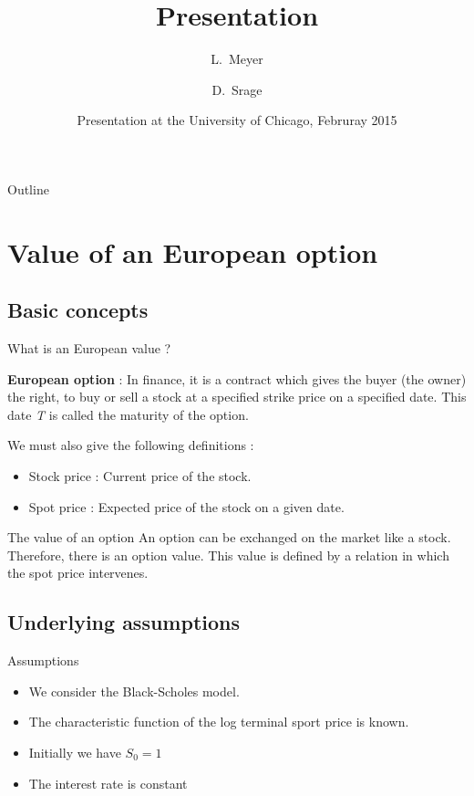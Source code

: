 \documentclass{beamer}
\title{Presentation}
\author{L.~Meyer \and D.~Srage}
\date{Presentation at the University of Chicago, Februray 2015}
\begin{document}
\begin{frame}
  \titlepage
\end{frame}

\begin{frame}{Outline}
  \tableofcontents
\end{frame}

\section{Value of an European option}

\subsection{Basic concepts}

\begin{frame}{What is an European value ?}
\begin{definition}
\textbf{European option} : In finance, it is a contract which gives the buyer (the owner) the right, to buy or sell a stock at a specified \alert{strike price} on a specified date. This date \emph{T} is called the \alert{maturity} of the option. 
\end{definition}
We must also give the following definitions :
\begin{itemize}
\item \alert{Stock price} : Current price of the stock.
\item \alert{Spot price} : Expected price of the stock on a given date.
\end{itemize}
\end{frame}

\begin{frame}{The value of an option}
An option can be exchanged on the market like a stock. Therefore, there is an option value. This value is defined by a relation in which the spot price intervenes.
\end{frame}

\subsection{Underlying assumptions}
\begin{frame}{Assumptions}
\begin{itemize}
\item We consider the Black-Scholes model.
\item The characteristic function of the log terminal sport price is known.
\item Initially we have $S_{0}=1$
\item The interest rate is constant
\end{itemize}
\end{frame}
\end{document}

